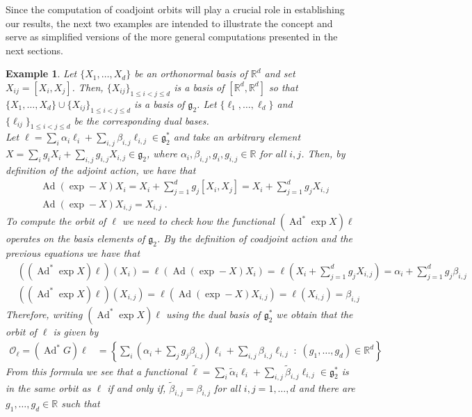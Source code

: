 \documentclass[pdflatex,sn-mathphys-num]{sn-jnl}
\theoremstyle{thmstyletwo}
\theoremstyle{thmstyleone}
\theoremstyle{thmstyletwo}
\newtheorem{example}[definition]{Example}
\newcommand{\fancyg}{\mathfrak{g}}
\newcommand{\coadjoint}{\operatorname{Ad}^*}
\newcommand{\Adjoint}{\operatorname{Ad}}
\newcommand{\R}{\mathbb{R}}
\begin{document}
	Since the computation of coadjoint orbits will play a crucial role in establishing our results, the next two examples are intended to illustrate the concept and serve as simplified versions of the more general computations presented in the next sections.
	\begin{example}\label{ex: explicit orbits of g2}
		Let $\{X_1, \ldots, X_d\}$ be an orthonormal basis of $\mathbb{R}^d$ and  set $X_{ij} = [X_i,X_j]$. Then, $\{X_{ij}\}_{1\leq i<j\leq d}$ is a basis of $[\mathbb{R}^d, \mathbb{R}^d]$ so that $\{X_1, \ldots, X_d\} \cup \{X_{ij}\}_{1\leq i<j\leq d}$ is a basis of $\fancyg_2$. Let  $\{\ell_1, \ldots, \ell_{d}\}$ and $\{\ell_{ij}\}_{1\leq i<j\leq d}$ be the corresponding dual bases.\\
		Let $\ell = \sum_i \alpha_i \ell_i + \sum_{i,j} \beta_{i,j} \ell_{i,j} \in \fancyg_2^*$ and take an arbitrary element $X = \sum_{i} g_{i}X_i +  \sum_{i,j} g_{i,j} X_{i,j} \in \fancyg_2$, where $\alpha_i, \beta_{i,j}, g_{i},g_{i,j} \in \mathbb{R}$ for all $i,j$. Then, by definition of the adjoint action, we have that
		\begin{align*}
			&\Adjoint(\operatorname{exp}-X)X_i =X_i+\sum_{j=1}^d g_j[X_i, X_j] = X_i + \sum_{j=1}^d g_j X_{i,j}\\ %
			& \Adjoint(\operatorname{exp}-X)X_{i,j} = X_{i,j} \;.
		\end{align*}
		To compute the orbit of $\ell$ we need to check how the functional  $(\coadjoint \exp X)\ell$ operates on the basis elements of $\fancyg_2$. By the definition of coadjoint action and the previous equations we have that
		\begin{align*}
			&((\coadjoint \exp X)\ell)(X_i) = \ell(\Adjoint(\exp -X)X_i) = \ell\left(X_i + \sum_{j=1}^d g_j X_{i,j}\right) = \alpha_i + \sum_{j=1}^d g_j\beta_{i,j} \\
			&((\coadjoint \exp X)\ell)(X_{i,j}) = \ell(\Adjoint(\exp -X)X_{i,j}) = \ell(X_{i,j}) = \beta_{i,j}
		\end{align*}
		Therefore, writing $(\coadjoint \exp X)\ell$ using the dual basis of $\fancyg_2^*$ we obtain that the orbit of $\ell$ is given by
		\begin{align*}
			\mathcal{O}_{\ell} = (\coadjoint G) \ell &= \left\{\sum_i(\alpha_i+\sum_jg_{j}\beta_{i,j})\ell_i+\sum_{i,j}\beta_{i,j}\ell_{i,j} \;:\; (g_{1}, \ldots, g_d) \in \mathbb{R}^d\right\}
		\end{align*}
		From this formula we see that a functional $\tilde{\ell} = \sum_i \tilde{\alpha}_i {\ell}_i + \sum_{i,j} \tilde{\beta}_{i,j} {\ell}_{i,j} \in {\fancyg}_2^*$ is in the same orbit as $\ell$ if and only if, $\tilde{\beta}_{i,j}= \beta_{i,j}$ for all $i,j = 1, \ldots, d$ {and} there are $g_1, \ldots, g_d \in \R$ such that

\end{example}
\end{document}
